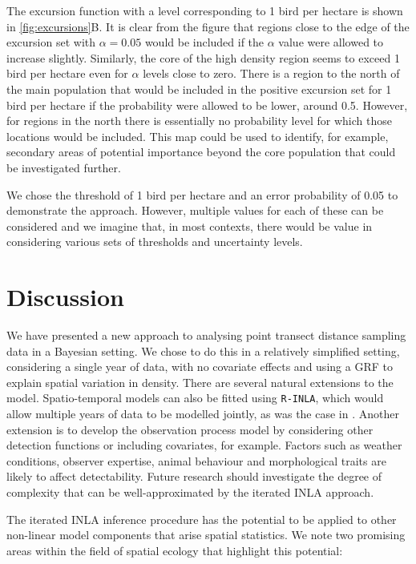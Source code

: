 \documentclass{stylefile16/statsoc}
\begin{document}
The excursion function with a level corresponding to 1 bird per hectare is shown in \autoref{fig:excursions}B.  It is clear from the figure that regions close to the edge of the excursion set with $\alpha = 0.05$ would be included if the $\alpha$ value were allowed to increase slightly.  Similarly, the core of the high density region seems to exceed 1 bird per hectare even for $\alpha$ levels close to zero.  There is a region to the north of the main population that would be included in the positive excursion set for 1 bird per hectare if the probability were allowed to be lower, around 0.5.  However, for regions in the north there is essentially no probability level for which those locations would be included.  This map could be used to identify, for example, secondary areas of potential importance beyond the core population that could be investigated further.

We chose the threshold of 1 bird per hectare and an error probability of 0.05 to demonstrate the approach.  However, multiple values for each of these can be considered and we imagine that, in most contexts, there would be value in considering various sets of thresholds and uncertainty levels.


\section{Discussion}
\label{sec-discussion}

We have presented a new approach to analysing point transect distance sampling data in a Bayesian setting.  We chose to do this in a relatively simplified setting, considering a single year of data, with no covariate effects and using a GRF to explain spatial variation in density.  There are several natural extensions to the model.  Spatio-temporal models can also be fitted using \texttt{R-INLA}, which would allow multiple years of data to be modelled jointly, as was the case in \citep{camp_dsm_2020}.  Another extension is to develop the observation process model by considering other detection functions or including covariates, for example.  Factors such as weather conditions, observer expertise, animal behaviour and morphological traits are likely to affect detectability.  Future research should investigate the degree of complexity that can be well-approximated by the iterated INLA approach.

The iterated INLA inference procedure has the potential to be applied to other non-linear model components that arise spatial statistics.  We note two promising areas within the field of spatial ecology that highlight this potential: 
\end{document}
